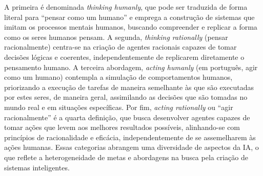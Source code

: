 \documentclass[tcc2]{uftex}
\begin{document}
A primeira é denominada \textit{thinking humanly}, que pode ser traduzida de forma literal para ``pensar como um humano'' e emprega a construção de sistemas que imitam os processos mentais humanos, buscando compreender e replicar a forma como os seres humanos pensam. A segunda, \textit{thinking rationally} (pensar racionalmente) centra-se na criação de agentes racionais capazes de tomar decisões lógicas e coerentes, independentemente de replicarem diretamente o pensamento humano. A terceira abordagem, \textit{acting humanly} (em português, agir como um humano) contempla a simulação de comportamentos humanos, priorizando a execução de tarefas de maneira semelhante às que são executadas por estes seres, de maneira geral, assimilando as decisões que são tomadas no mundo real e em situações específicas. Por fim, \textit{acting rationally} ou ``agir racionalmente'' é a quarta definição, que busca desenvolver agentes capazes de tomar ações que levem aos melhores resultados possíveis, alinhando-se com princípios de racionalidade e eficácia, independentemente de se assemelharem às ações humanas. Essas categorias abrangem uma diversidade de aspectos da IA, o que reflete a heterogeneidade de metas e abordagens na busca pela criação de sistemas inteligentes.
\end{document}
